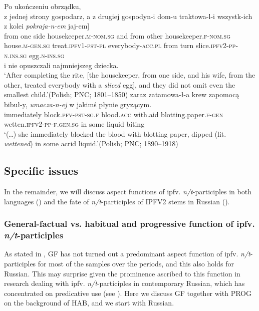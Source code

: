 \documentclass[output=paper]{langscibook}
\begin{document}
\ea\label{wiem:ex:sliced}
{Po ukończeniu obrządku,}\\
\gll \minsp{[} {z} {jednej} {strony} {gospodarz}, {a} {z} {drugiej} {gospodyn-i} {dom-u} {traktowa-l-i} {wszystk-ich} {z} {kolei} {\textit{pokraja-n-em}} {jaj-em}] \\
{} from one side housekeeper.\textsc{m-nom.sg}
and from other housekeeper.\textsc{f-nom.sg} house.\textsc{m-gen.sg}
treat.\textsc{ipfv1-pst-pl} everybody-\textsc{acc.pl} from turn
slice.\textsc{ipfv2-pp-n.ins.sg} egg.\textsc{n-ins.sg} \\
{i nie opuszczali najmniejszeg dziecka.} \\
\glt ‘After completing the rite, [the housekeeper, from one side, and his wife, from the other, treated everybody with a \textit{sliced} egg], and they did not omit even the smallest child.’\hfill (Polish; PNC; 1801--1850)
\ex\label{wiem:ex:wettened}
 {zaraz} {zatamowa-ł-a} {krew} {zapomocą} {bibuł-y}, {\textit{umacza-n-ej}} {w} {jakimś} {płynie} {gryzącym}.\\
{} immediately block.\textsc{pfv-pst-sg.f} blood.\textsc{acc} with.aid blotting.paper.\textsc{f-gen} wetten.\textsc{ipfv2-pp-f.gen.sg} in some liquid biting\\
\glt ‘(\dots) she immediately blocked the blood with blotting paper, dipped (lit. \textit{wettened}) in some acrid liquid.’\hfill (Polish; PNC; 1890--1918)
\z

\subsection{Specific issues}\label{wiem:sec:specific-issues}

In the remainder, we will discuss aspect functions of ipfv. \textit{n/t}-participles in both languages () and the fate of \textit{n/t}-participles of IPFV2 stems in Russian ().

\subsubsection{General-factual vs. habitual and progressive function of ipfv. \textit{n/t}-participles}\label{wiem:sec:gen-factVS-hab}

As stated in , GF has not turned out a predominant aspect function of ipfv. \textit{n/t}-participles for most of the samples over the periods, and this also holds for Russian. This may surprise given the prominence ascribed to this function in research dealing with ipfv. \textit{n/t}-participles in contemporary Russian, which has concentrated on predicative use (see ). Here we discuss GF together with PROG on the background of HAB, and we start with Russian.
\end{document}
